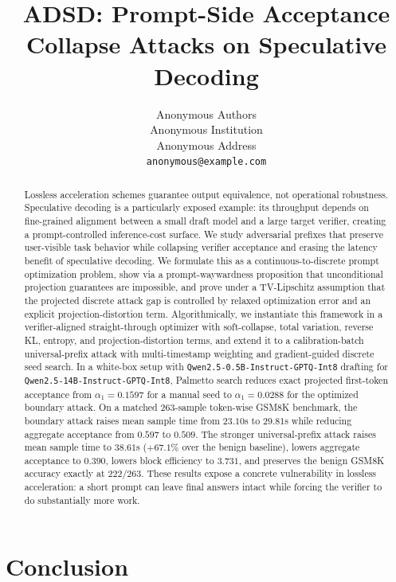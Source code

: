 \documentclass{article}
\title{ADSD: Prompt-Side Acceptance Collapse Attacks on Speculative Decoding}
\author{%
  Anonymous Authors \\
  Anonymous Institution \\
  Anonymous Address \\
  \texttt{anonymous@example.com} \\
}
\begin{document}
\maketitle


\begin{abstract}
Lossless acceleration schemes guarantee output equivalence, not operational
robustness. Speculative decoding is a particularly exposed example: its
throughput depends on fine-grained alignment between a small draft model and a
large target verifier, creating a prompt-controlled inference-cost surface. We
study adversarial prefixes that preserve user-visible task behavior while
collapsing verifier acceptance and erasing the latency benefit of speculative
decoding. We formulate this as a continuous-to-discrete prompt optimization
problem, show via a prompt-waywardness proposition that unconditional
projection guarantees are impossible, and prove under a TV-Lipschitz assumption
that the projected discrete attack gap is controlled by relaxed optimization
error and an explicit projection-distortion term. Algorithmically, we
instantiate this framework in a verifier-aligned straight-through optimizer
with soft-collapse, total variation, reverse KL, entropy, and
projection-distortion terms, and extend it to a calibration-batch
universal-prefix attack with multi-timestamp weighting and gradient-guided
discrete seed search. In a white-box setup with
\texttt{Qwen2.5-0.5B-Instruct-GPTQ-Int8} drafting for
\texttt{Qwen2.5-14B-Instruct-GPTQ-Int8}, Palmetto search reduces exact
projected first-token acceptance from $\alpha_1=0.1597$ for a manual seed to
$\alpha_1=0.0288$ for the optimized boundary attack. On a matched 263-sample
token-wise GSM8K benchmark, the boundary attack raises mean sample time from
$23.10$s to $29.81$s while reducing aggregate acceptance from $0.597$ to
$0.509$. The stronger universal-prefix attack raises mean sample time to
$38.61$s ($+67.1\%$ over the benign baseline), lowers aggregate acceptance to
$0.390$, lowers block efficiency to $3.731$, and preserves the benign GSM8K
accuracy exactly at $222/263$. These results expose a concrete vulnerability in
lossless acceleration: a short prompt can leave final answers intact while
forcing the verifier to do substantially more work.
\end{abstract}







\section{Conclusion}
\end{document}
